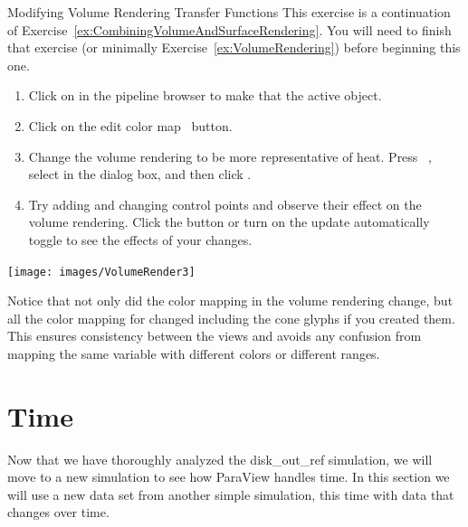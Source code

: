 \begin{exercise}{Modifying Volume Rendering Transfer Functions}
  \label{ex:ModifyingVolumeRenderingTransferFunctions}%
  This exercise is a continuation of
  Exercise~\ref{ex:CombiningVolumeAndSurfaceRendering}.  You will need to
  finish that exercise (or minimally Exercise~\ref{ex:VolumeRendering})
  before beginning this one.

  \begin{enumerate}
  \item Click on  in the pipeline browser to make
    that the active object.
  \item Click on the edit color map~ button.
  \item Change the volume rendering to be more representative of heat.
    Press ~, select  in the dialog box, and then click .
  \item Try adding and changing control points and observe their effect on
    the volume rendering.  Click the  button or turn on the
    update automatically~ toggle to see the effects of
    your changes.
  \end{enumerate}

  \begin{inlinefig}
    \texttt{[image: images/VolumeRender3]}
  \end{inlinefig}

  Notice that not only did the color mapping in the volume rendering
  change, but all the color mapping for  changed including the
  cone glyphs if you created them.  This ensures consistency between the
  views and avoids any confusion from mapping the same variable with
  different colors or different ranges.
\end{exercise}


\section{Time}
\label{sec:Time}

Now that we have thoroughly analyzed the disk\_out\_ref simulation, we will
move to a new simulation to see how ParaView handles time.  In this section
we will use a new data set from another simple simulation, this time with
data that changes over time.

